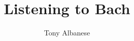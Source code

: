 \documentclass[14pt]{beamer}
\author{Tony Albanese}
\title{Listening to Bach}
\begin{document}
	\maketitle
	
	\begin{frame}
		\frametitle{}
	\end{frame}
\end{document}
